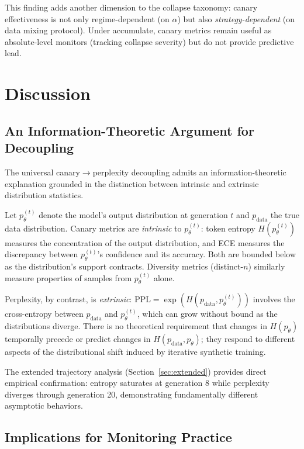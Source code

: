 \documentclass[letterpaper,11pt]{article}
\begin{document}
This finding adds another dimension to the collapse taxonomy: canary effectiveness is not only regime-dependent (on $\alpha$) but also \emph{strategy-dependent} (on data mixing protocol).
Under accumulate, canary metrics remain useful as absolute-level monitors (tracking collapse severity) but do not provide predictive lead.

\section{Discussion}

\subsection{An Information-Theoretic Argument for Decoupling}

The universal canary$\to$perplexity decoupling admits an information-theoretic explanation grounded in the distinction between intrinsic and extrinsic distribution statistics.

Let $p_\theta^{(t)}$ denote the model's output distribution at generation $t$ and $p_{\text{data}}$ the true data distribution.
Canary metrics are \emph{intrinsic} to $p_\theta^{(t)}$: token entropy $H(p_\theta^{(t)})$ measures the concentration of the output distribution, and ECE measures the discrepancy between $p_\theta^{(t)}$'s confidence and its accuracy.
Both are bounded below as the distribution's support contracts.
Diversity metrics (distinct-$n$) similarly measure properties of samples from $p_\theta^{(t)}$ alone.

Perplexity, by contrast, is \emph{extrinsic}: $\text{PPL} = \exp(H(p_{\text{data}}, p_\theta^{(t)}))$ involves the cross-entropy between $p_{\text{data}}$ and $p_\theta^{(t)}$, which can grow without bound as the distributions diverge.
There is no theoretical requirement that changes in $H(p_\theta)$ temporally precede or predict changes in $H(p_{\text{data}}, p_\theta)$; they respond to different aspects of the distributional shift induced by iterative synthetic training.

The extended trajectory analysis (Section~\ref{sec:extended}) provides direct empirical confirmation: entropy saturates at generation 8 while perplexity diverges through generation 20, demonstrating fundamentally different asymptotic behaviors.

\subsection{Implications for Monitoring Practice}
\end{document}
